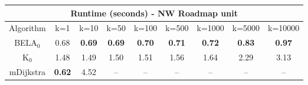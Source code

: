 \begin{tabular}{c|cccccccc}\toprule
\multicolumn{9}{c}{Runtime (seconds) - NW Roadmap unit}\\ \midrule
Algorithm & k=1 & k=10 & k=50 & k=100 & k=500 & k=1000 & k=5000 & k=10000 \\ \midrule
BELA$_0$ & 0.68 & \textbf{0.69} & \textbf{0.69} & \textbf{0.70} & \textbf{0.71} & \textbf{0.72} & \textbf{0.83} & \textbf{0.97} \\
K$_0$ & 1.48 & 1.49 & 1.50 & 1.51 & 1.56 & 1.64 & 2.29 & 3.13 \\
mDijkstra & \textbf{0.62} & 4.52 & -- & -- & -- & -- & -- & -- \\ \bottomrule 
\end{tabular}
